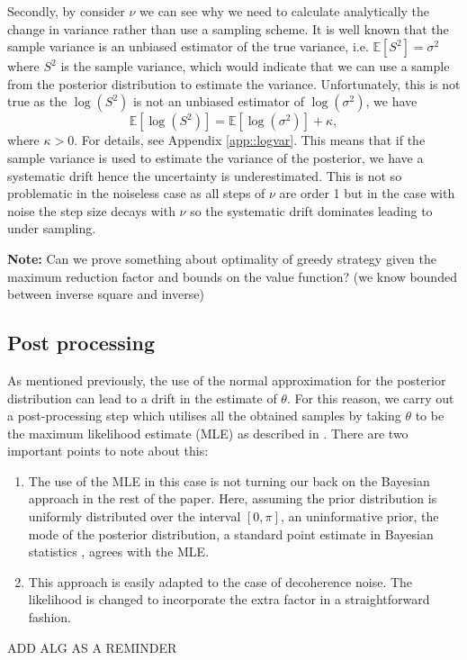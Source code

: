Secondly, by consider $\nu$ we can see why we need to calculate analytically the change in variance rather than use a sampling scheme. It is well known that the sample variance is an unbiased estimator of the true variance, i.e. $\mathbb{E}\left[S^2\right]=\sigma^2$ where $S^2$ is the sample variance, which would indicate that we can use a sample from the posterior distribution to estimate the variance. Unfortunately, this is not true as the $\log(S^2)$ is not an unbiased estimator of $\log(\sigma^2)$, we have $$ \mathbb{E}\left[\log(S^2)\right] = \mathbb{E}\left[\log(\sigma^2)\right] +\kappa, $$ where $\kappa>0$. For details, see Appendix \ref{app::logvar}. This means that if the sample variance is used to estimate the variance of the posterior, we have a systematic drift hence the uncertainty is underestimated. This is not so problematic in the noiseless case as all steps of $\nu$ are order 1 but in the case with noise the step size decays with $\nu$ so the systematic drift dominates leading to under sampling.



{\color{red} {\bf Note:} Can we prove something about optimality of greedy strategy given the maximum reduction factor and bounds on the value function? (we know bounded between inverse square and inverse)}



\subsection{Post processing}\label{sec::post}
As mentioned previously, the use of the normal approximation for the posterior distribution can lead to a drift in the estimate of $\theta$. For this reason, we carry out a post-processing step which utilises all the obtained samples by taking $\theta$ to be the maximum likelihood estimate (MLE) as described in \cite{}. There are two important points to note about this:
\begin{enumerate}\item The use of the MLE in this case is not turning our back on the Bayesian approach in the rest of the paper. Here, assuming the prior distribution is uniformly distributed over the interval $[0,\pi]$, an uninformative prior, the mode of the posterior distribution, a standard point estimate in Bayesian statistics \cite{}, agrees with the MLE.
\item This approach is easily adapted to the case of decoherence noise. The likelihood is changed to incorporate the extra factor in a straightforward fashion.
\end{enumerate}

ADD ALG AS A REMINDER

\newpage
